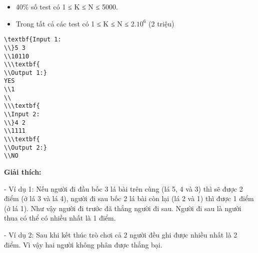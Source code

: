 \begin{itemize}
	\item     40\% số test có 1 ≤ K ≤ N ≤ 5000.   
	\item     Trong tất cả các test có 1 ≤ K ≤ N ≤ 2.$10^{6}$    (2 triệu)   
\end{itemize}
\begin{itemize}
\end{itemize}
\begin{verbatim}
\textbf{Input 1:
\\}5 3
\\10110
\\\textbf{
\\Output 1:}
YES
\\1
\\
\\\textbf{
\\Input 2:
\\}4 2
\\1111
\\\textbf{
\\Output 2:}
\\NO\end{verbatim}

\textbf{    Giải thích:   }

   - Ví dụ 1: Nếu người đi đầu bốc 3 lá bài trên cùng (lá 5, 4 và 3) thì sẽ được 2 điểm (ở lá 3 và lá 4), người đi sau bốc 2 lá bài còn lại (lá 2 và 1) thì được 1 điểm (ở lá 1). Như vậy người đi trước đã thắng người đi sau. Người đi sau là người thua có thể có nhiều nhất là 1 điểm.  

   - Ví dụ 2: Sau khi kết thúc trò chơi cả 2 người đều ghi được nhiều nhất là 2 điểm. Vì vậy hai người không phân được thắng bại.